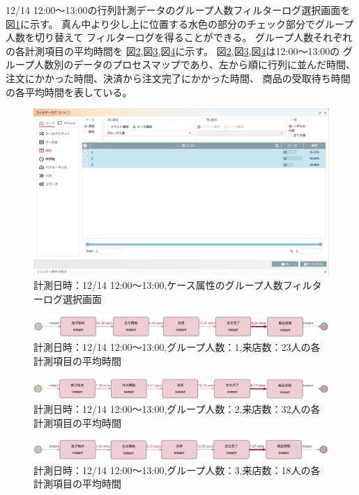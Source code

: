 \documentclass{jsarticle}
\begin{document}
12/14 12:00〜13:00の行列計測データのグループ人数フィルターログ選択画面を図\ref{fig:1214123}に示す。
真ん中より少し上に位置する水色の部分のチェック部分でグループ人数を切り替えて
フィルターログを得ることができる。
グループ人数それぞれの各計測項目の平均時間を
図\ref{fig:1-3a},図\ref{fig:2-3a},図\ref{fig:3-3a}に示す。
図\ref{fig:1-3a},図\ref{fig:2-3a},図\ref{fig:3-3a}は12:00〜13:00の
グループ人数別のデータのプロセスマップであり、左から順に行列に並んだ時間、
注文にかかった時間、決済から注文完了にかかった時間、
商品の受取待ち時間の各平均時間を表している。

\begin{figure}[H]
  \centering
  \includegraphics[width=15cm]{1214123.png}
  \caption{計測日時：12/14 12:00〜13:00,ケース属性のグループ人数フィルターログ選択画面}
  \label{fig:1214123}
\end{figure}

\begin{figure}[H]
  \centering
  \includegraphics[width=15cm]{1-3a.png}
  \caption{計測日時：12/14 12:00〜13:00,グループ人数：1,来店数：23人の各計測項目の平均時間}
  \label{fig:1-3a}
\end{figure}

\begin{figure}[H]
  \centering
  \includegraphics[width=15cm]{2-3a.png}
  \caption{計測日時：12/14 12:00〜13:00,グループ人数：2,来店数：32人の各計測項目の平均時間}
  \label{fig:2-3a}
\end{figure}

\begin{figure}[H]
  \centering
  \includegraphics[width=15cm]{3-3a.png}
  \caption{計測日時：12/14 12:00〜13:00,グループ人数：3,来店数：18人の各計測項目の平均時間}
  \label{fig:3-3a}
\end{figure}
\end{document}
